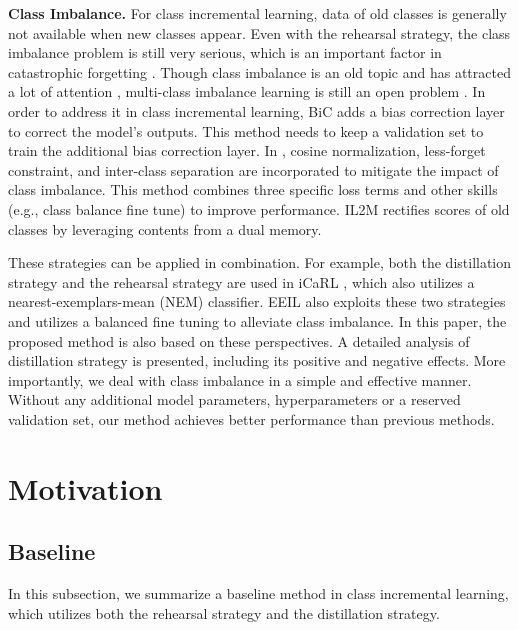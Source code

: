 \documentclass[10pt,twocolumn,letterpaper]{article}
\begin{document}
\textbf{Class Imbalance.} For class incremental learning, data of old classes is generally not available when new classes appear. Even with the rehearsal strategy, the class imbalance problem is still very serious, which is an important factor in catastrophic forgetting \cite{hou2019learning,wu2019large}. Though class imbalance is an old topic and has attracted a lot of attention \cite{Buda2018ASS,Huang2016LearningDR,Khan2015CostSensitiveLO}, multi-class imbalance learning is still an open problem \cite{Zhang2019MultiImbalanceAO}. In order to address it in class incremental learning, BiC \cite{wu2019large} adds a bias correction layer to correct the model's outputs. This method needs to keep a validation set to train the additional bias correction layer. In \cite{hou2019learning}, cosine normalization, less-forget constraint, and inter-class separation are incorporated to mitigate the impact of class imbalance. This method combines three specific loss terms and other skills (e.g., class balance fine tune) to improve performance. IL2M \cite{Belouadah_2019_ICCV} rectifies scores of old classes by leveraging contents from a dual memory.

These strategies can be applied in combination. For example, both the distillation strategy and the rehearsal strategy are used in iCaRL \cite{rebuffi2017icarl}, which also utilizes a nearest-exemplars-mean (NEM) classifier. EEIL \cite{castro2018end} also exploits these two strategies and utilizes a balanced fine tuning to alleviate class imbalance. In this paper, the proposed method is also based on these perspectives. A detailed analysis of distillation strategy is presented, including its positive and negative effects. More importantly, we deal with class imbalance in a simple and effective manner. Without any additional model parameters, hyperparameters or a reserved validation set, our method achieves better performance than previous methods.


\section{Motivation}\label{sec:motivation}

\subsection{Baseline}
In this subsection, we summarize a baseline method in class incremental learning, which utilizes both the rehearsal strategy and the distillation strategy. 
\end{document}
